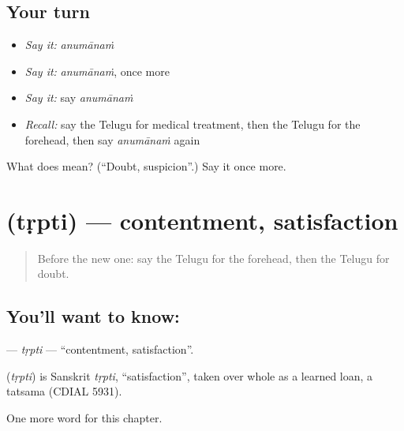 \subsection*{Your turn}
\begin{itemize}
\raggedright
  \item \emph{Say it:} \emph{anumānaṁ}
  \item \emph{Say it:} \emph{anumānaṁ}, once more
  \item \emph{Say it:} say \emph{anumānaṁ}
  \item \emph{Recall:} say the Telugu for medical treatment, then the Telugu for the forehead, then say \emph{anumānaṁ} again
\end{itemize}

\begin{tcolorbox}[breakable,colback=teal!4,colframe=teal!35!black,title={Before you move on}]
What does  mean? (\textquotedblleft{}Doubt, suspicion\textquotedblright{}.) Say it once more.
\end{tcolorbox}
\section[\texorpdfstring{\te{తృప్తి} (tṛpti)}{తృప్తి (tṛpti)}]{ (tṛpti) — contentment, satisfaction}

\label{lesson:TE-C210-trpti}



\begin{quote}
Before the new one: say the Telugu for the forehead, then the Telugu for doubt.
\end{quote}

\subsection*{You'll want to know: }
\textbf{} — \emph{tṛpti} — \textquotedblleft{}contentment, satisfaction\textquotedblright{}.

\begin{cousinweb}
\textbf{} (\emph{tṛpti}) is Sanskrit \emph{tṛpti}, \textquotedblleft{}satisfaction\textquotedblright{}, taken over whole as a learned loan, a tatsama (CDIAL 5931).
\end{cousinweb}

\begin{grammarlens}[title={What you've built}]
One more word for this chapter.
\end{grammarlens}

